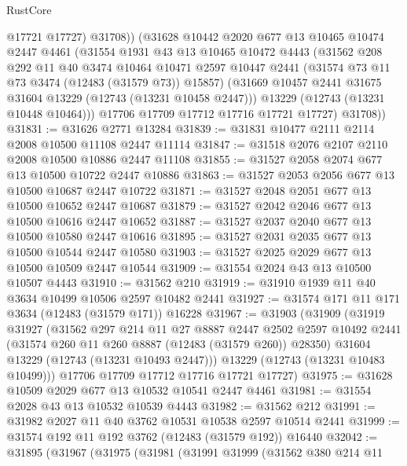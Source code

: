 \begin{lexlean}{RustCore}
\begin{coremodule}
            @17721
            @17727)
          @31708))
      (@31628
        @10442
        @2020
        @677
        @13
        @10465
        @10474
        @2447
        @4461
        (@31554
          @1931
          @43
          @13
          @10465
          @10472
          @4443
          (@31562
            @208
            @292
            @11
            @40
            @3474
            @10464
            @10471
            @2597
            @10447
            @2441
            (@31574 @73 @11 @73 @3474 (@12483 (@31579 @73)) @15857)
            (@31669 @10457 @2441 @31675 @31604 @13229 (@12743 (@13231 @10458 @2447)))
            @13229
            (@12743 (@13231 @10448 @10464)))
          @17706
          @17709
          @17712
          @17716
          @17721
          @17727)
        @31708))
@31831 := @31626 @2771 @13284
@31839 := @31831 @10477 @2111 @2114 @2008 @10500 @11108 @2447 @11114
@31847 := @31518 @2076 @2107 @2110 @2008 @10500 @10886 @2447 @11108
@31855 := @31527 @2058 @2074 @677 @13 @10500 @10722 @2447 @10886
@31863 := @31527 @2053 @2056 @677 @13 @10500 @10687 @2447 @10722
@31871 := @31527 @2048 @2051 @677 @13 @10500 @10652 @2447 @10687
@31879 := @31527 @2042 @2046 @677 @13 @10500 @10616 @2447 @10652
@31887 := @31527 @2037 @2040 @677 @13 @10500 @10580 @2447 @10616
@31895 := @31527 @2031 @2035 @677 @13 @10500 @10544 @2447 @10580
@31903 := @31527 @2025 @2029 @677 @13 @10500 @10509 @2447 @10544
@31909 := @31554 @2024 @43 @13 @10500 @10507 @4443
@31910 := @31562 @210
@31919 := @31910 @1939 @11 @40 @3634 @10499 @10506 @2597 @10482 @2441
@31927 := @31574 @171 @11 @171 @3634 (@12483 (@31579 @171)) @16228
@31967 := @31903
    (@31909
      (@31919
        @31927
        (@31562
          @297
          @214
          @11
          @27
          @8887
          @2447
          @2502
          @2597
          @10492
          @2441
          (@31574 @260 @11 @260 @8887 (@12483 (@31579 @260)) @28350)
          @31604
          @13229
          (@12743 (@13231 @10493 @2447)))
        @13229
        (@12743 (@13231 @10483 @10499)))
      @17706
      @17709
      @17712
      @17716
      @17721
      @17727)
@31975 := @31628 @10509 @2029 @677 @13 @10532 @10541 @2447 @4461
@31981 := @31554 @2028 @43 @13 @10532 @10539 @4443
@31982 := @31562 @212
@31991 := @31982 @2027 @11 @40 @3762 @10531 @10538 @2597 @10514 @2441
@31999 := @31574 @192 @11 @192 @3762 (@12483 (@31579 @192)) @16440
@32042 := @31895
    (@31967
      (@31975
        (@31981
          (@31991
            @31999
            (@31562
              @380
              @214
              @11

\end{coremodule}
\end{lexlean}
